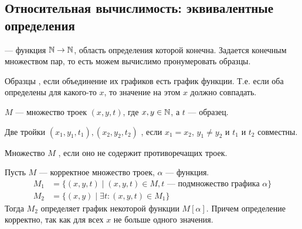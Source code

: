 \subsection{Относительная вычислимость: эквивалентные определения}
\begin{defn}[Образец]
	 --- функция $ \mathbb{N} \to \mathbb{N}$, область определения которой конечна. Задается конечным множеством пар, то есть  можем вычислимо пронумеровать образцы.
	
	\noindent
	Образцы , если объединение их графиков есть график функции. Т.е. если оба определены для какого-то $ x$, то значение на этом $ x$ должно совпадать.
\end{defn}
\begin{defn}[]
	$ M$ --- множество троек $ (x, y, t)$, где  $ x, y \in \mathbb{N}$, а $ t$ --- образец.

	\noindent
	Две тройки $ (x_1, y_1, t_1), (x_2, y_2, t_2)$ , если $  x_1= x_2$, $  y_1 \ne  y_2$ и $  t_1$ и $  t_2$ совместны.

	\noindent
	Множество $ M$ , если оно не содержит противоречащих троек.
\end{defn}
\begin{defn}
    Пусть  $  M$ --- корректное множество троек, $ \alpha $ --- функция.
	\[
	\begin{aligned}
		M_1& = \{(x, y, t) \mid (x, y, t) \in M, t \text{ --- подмножество графика } \alpha \} \\
		M_2&= \{(x, y) \mid \exists t\colon (x, y, t) \in M_1\}
	\end{aligned}
	\]
	Тогда $  M_2$ определяет график некоторой функции $ M[ \alpha ]$. Причем определение корректно, так как для всех $ x$ не больше одного значения.
\end{defn}

